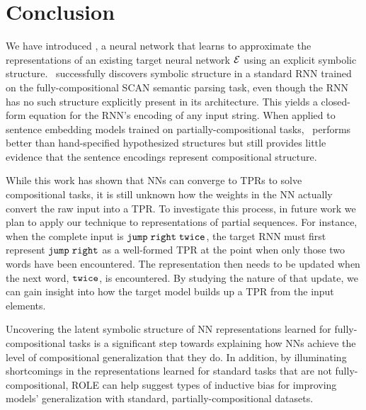 \section{Conclusion} \label{sec:rldn-Conclusion}

We have introduced \RLN, a neural network that learns to approximate the representations of an existing target neural network ${\mathcal{E}}$ using an explicit symbolic structure. \RLN\ successfully discovers symbolic structure in a standard RNN trained on the fully-compositional SCAN semantic parsing task, even though the RNN has no such structure explicitly present in its architecture. This yields a closed-form equation for the RNN's encoding of any input string. 
When applied to sentence embedding models trained on partially-compositional tasks, \RLN\ performs better than hand-specified hypothesized structures but still provides little evidence that the sentence encodings represent compositional structure. 

While this work has shown that NNs can converge to TPRs to solve compositional tasks, it is still unknown how the weights in the NN actually convert the raw input into a TPR. To investigate this process, in future work we plan to apply our technique to representations of partial sequences. For instance, when the complete input is \textcolor{violet}{${\mathtt{jump \hspace{1mm} right \hspace{1mm} twice}}$}, the target RNN must first represent \textcolor{violet}{${\mathtt{jump \hspace{1mm} right}}$} as a well-formed TPR at the point when only those two words have been encountered. The representation then needs to be updated when the next word, \textcolor{violet}{${\mathtt{twice}}$}, is encountered. By studying the nature of that update, we can gain insight into how the target model builds up a TPR from the input elements.



Uncovering the latent symbolic structure of NN representations learned for fully-compositional tasks is a significant step towards explaining how NNs achieve the level of compositional generalization that they do. In addition, by illuminating shortcomings in the representations learned for standard tasks that are not fully-compositional, ROLE can help suggest types of inductive bias for improving models' generalization with standard, partially-compositional datasets.